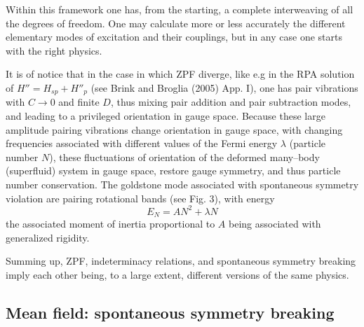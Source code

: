 \documentclass[a4paper,onecolumn,superscriptaddress,12pt,nofootinbib,twoside,raggedfooter,notitlepage]{revtex4-1}
\begin{document}
Within this framework one has, from the starting, a complete interweaving of all the degrees of freedom. One may calculate more or less accurately the different elementary modes of excitation and their couplings, but in any case one starts with the right physics.

It is of notice that in the case in which ZPF diverge, like e.g in the RPA solution of $H''=H_{sp} + H''_p$ (see Brink and Broglia (2005) App. I), one has pair vibrations with $C \rightarrow 0$ and finite $D$, thus mixing pair addition and pair subtraction modes, and leading to a privileged orientation in gauge space. Because these large amplitude pairing vibrations change orientation in gauge space, with changing frequencies associated with different values of the Fermi energy $\lambda$ (particle number $N$), these fluctuations of orientation of the deformed many--body (superfluid) system in gauge space, restore gauge symmetry, and thus particle number conservation. The goldstone mode associated with spontaneous symmetry violation are pairing rotational bands (see Fig. 3), with energy
$$E_N = AN^2 + \lambda N$$
the associated moment of inertia proportional to $A$ being associated with generalized rigidity.

Summing up, ZPF, indeterminacy relations, and spontaneous symmetry breaking imply each other being, to a large extent, different versions of the same physics.


\subsection{Mean field: spontaneous symmetry breaking}
\end{document}

